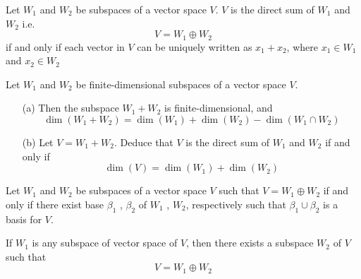 \begin{thm} %
	Let $W_1$ and $W_2$ be subspaces of a vector space $V$. $V$ is the direct sum of $W_1$ and $W_2$ i.e. $$ V = W_1 \oplus W_2 $$ if and only if each vector in $V$ can be uniquely written as $x_1 + x_2$, where $x_1 \in W_1$ and $x_2 \in W_2$
\end{thm}

%



\begin{thm} %
Let $W_1$ and $W_2$ be finite-dimensional subspaces of a vector space $V$.
\begin{enumerate} 
	\item [(a)]Then the subspace $W_1 + W_2$ is finite-dimensional, and $$\dim(W_1 + W_2) = \dim(W_1) + \dim(W_2) - \dim(W_1 \cap W_2)$$
    \item [(b)]  Let $V = W_1 + W_2$. Deduce that $V$ is the direct sum of $W_1$ and $W_2$ if and only if $$\dim(V) = \dim(W_1) + \dim(W_2)$$
\end{enumerate}	
\end{thm}
\pfshow{}


\begin{thm} %
Let $W_1$ and $W_2$ be subspaces of a vector space $V$ such that $V = W_1 \oplus W_2$ if and only if there exist base $\beta_1$ , $\beta_2$ of $W_1$ , $W_2$, respectively such that $\beta_1 \cup \beta_2$ is a basis for $V$.
\end{thm}
\pfshow{}


\begin{thm} %
		\item If $W_1$ is any subspace of vector space of $V$, then there exists a subspace $W_2$ of $V$ such that $$ V = W_1 \oplus W_2 $$
\end{thm}
\pfshow{}

         